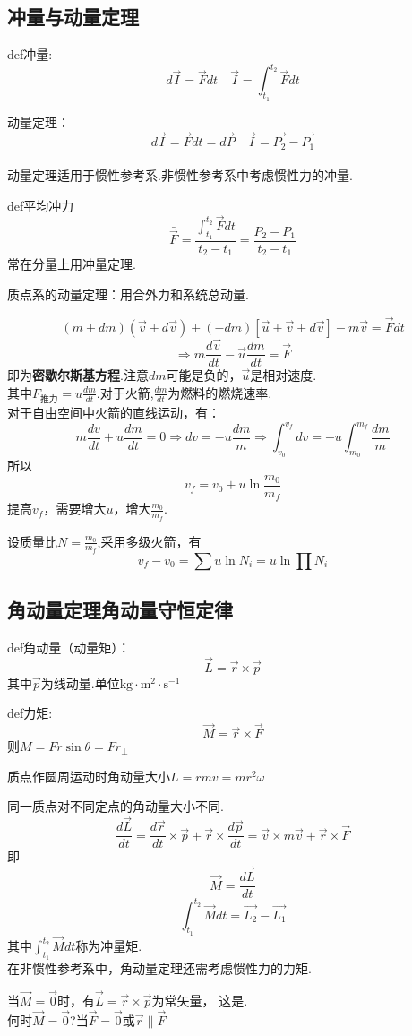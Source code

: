 \documentclass[10pt,a4paper]{article}
\begin{document}
\subsection{冲量与动量定理}
def冲量:
\[d\vec{I}=\vec{F}dt\quad \vec{I}=\int_{t_1}^{t_2}\vec{F}dt\]

动量定理：
\[d\vec{I}=\vec{F}dt=d\vec{P}\quad \vec{I}=\vec{P_2}-\vec{P_1}\]\\
动量定理适用于惯性参考系.非惯性参考系中考虑惯性力的冲量.

def平均冲力
\[\bar{\vec{F}}=\frac{\int_{t_1}^{t_2}\vec{F}dt}{t_2-t_1}=\frac{P_2-P_1}{t_2-t_1}\]
常在分量上用冲量定理.

质点系的动量定理：用合外力和系统总动量.

\[(m+dm)(\vec{v}+d\vec{v})+(-dm)[\vec{u}+\vec{v}+d\vec{v}]-m\vec{v}=\vec{F}dt\]
\[\Rightarrow m\frac{d\vec{v}}{dt}-\vec{u}\frac{dm}{dt}=\vec{F}\]
即为\textbf{密歇尔斯基方程}.注意$dm$可能是负的，$\vec{u}$是相对速度.
\\其中$F_\text{推力}=u\frac{dm}{dt}$.对于火箭,$\frac{dm}{dt}$为燃料的燃烧速率.\\
对于自由空间中火箭的直线运动，有：
\[m\frac{dv}{dt}+u\frac{dm}{dt}=0
\Rightarrow dv=-u\frac{dm}{m}\Rightarrow
\int_{v_0}^{v_f}dv=-u\int_{m_0}^{m_f}\frac{dm}{m}
\]
所以\[v_f=v_0+u\ln\frac{m_0}{m_f}\]
提高$v_f$，需要增大$u$，增大$\frac{m_0}{m_f}$.

设质量比$N=\frac{m_0}{m_f}$,采用多级火箭，有
\[v_f-v_0=\sum u\ln N_i=u \ln \prod N_i\]
\subsection{角动量定理\quad 角动量守恒定律}
def角动量（动量矩）：
\[\vec{L}=\vec{r}\times\vec{p}\]
其中$\vec{p}$为线动量.单位$\text{kg}\cdot\text{m}^2\cdot\text{s}^{-1}$

def力矩:
\[\vec{M}=\vec{r}\times\vec{F}\]
则$M=Fr\sin\theta=Fr_{\perp}$

质点作圆周运动时角动量大小$L=rmv=mr^2\omega$

同一质点对不同定点的角动量大小不同.
\[\frac{d\vec{L}}{dt}=\frac{d\vec{r}}{dt}\times\vec{p}
+\vec{r}\times\frac{d\vec{p}}{dt}
=\vec{v}\times m\vec{v}+\vec{r}\times \vec{F}\]
即
\[\vec{M}=\frac{d\vec{L}}{dt}\]
\[\int_{t_1}^{t_2}\vec{M}dt=\vec{L_2}-\vec{L_1}\]
其中$\int_{t_1}^{t_2}\vec{M}dt$称为冲量矩.\\
在非惯性参考系中，角动量定理还需考虑惯性力的力矩.

当$\vec{M}=\vec{0}$时，有$\vec{L}=\vec{r}\times \vec{p}$为常矢量，
这是.\\
何时$\vec{M}=\vec{0}$?当$\vec{F}=\vec{0}$或$\vec{r}\parallel\vec{F}$
\end{document}
